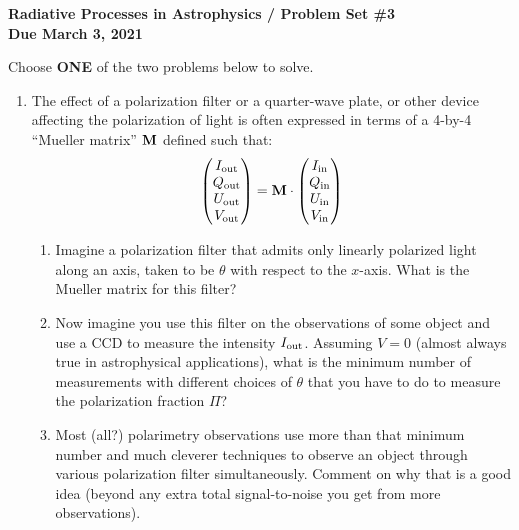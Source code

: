 \documentclass[11pt, preprint]{article}
\begin{document}
\begin{center}
  {\bf Radiative Processes in Astrophysics / Problem Set \#3 \\
    Due March 3, 2021}
\end{center}

Choose {\bf ONE} of the two problems below to solve.

\begin{enumerate}
\item The effect of a polarization filter or a quarter-wave plate, or
  other device affecting the polarization of light is often expressed
  in terms of a 4-by-4 ``Mueller matrix'' ${\bf M}$ defined such that:
  \begin{equation}
    \begin{pmatrix}
      I_{\rm out} \\
      Q_{\rm out} \\
      U_{\rm out} \\
      V_{\rm out} \\
    \end{pmatrix}
    = 
    {\bf M} 
    \cdot
    \begin{pmatrix}
      I_{\rm in} \\
      Q_{\rm in} \\
      U_{\rm in} \\
      V_{\rm in} \\
    \end{pmatrix}
  \end{equation}

  \begin{enumerate}
    \item Imagine a polarization filter that admits only linearly polarized
  light along an axis, taken to be $\theta$ with respect to the
  $x$-axis. What is the Mueller matrix for this filter?

  \item Now imagine you use this filter on the observations of some
    object and use a CCD to measure the intensity $I_{\rm
      out}$. Assuming $V=0$ (almost always true in astrophysical
    applications), what is the minimum number of measurements with
    different choices of $\theta$ that you have to do to measure the
    polarization fraction $\Pi$?

  \item Most (all?) polarimetry observations use more than that
    minimum number and much cleverer techniques to observe an object
    through various polarization filter simultaneously. Comment on why
    that is a good idea (beyond any extra total signal-to-noise you
    get from more observations).
  \end{enumerate}


\end{enumerate}
\end{document}

